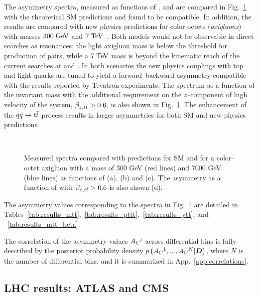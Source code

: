 The asymmetry spectra, measured as functions of
\mtt{}, \pttt{} and \ytt{} are compared in Fig.~\ref{fig:unfac_diff}
with the theoretical SM predictions and found to be compatible. 
In addition, the results are compared with new physics predictions for
color octets ({\it axigluons}) with masses $300 \; \mathrm{GeV}{}$ and $7
\; \mathrm{TeV}{}$~\cite{AguilarSaavedra:2011ci}. Both models would not
be observable in direct searches as \ttbar{} resonances: the light
axigluon mass is below the threshold for production of \ttbar{}
pairs, while a $7 \; \mathrm{TeV}$ mass is beyond the kinematic reach of the
current searches at \seventev{} and \eighttev{}. In both scenarios
the new physics couplings with top and light quarks are tuned to yield a
forward--backward asymmetry compatible with the results reported by
Tevatron experiments. 
The \ac{} spectrum as a function of the \ttbar{} invariant mass \mtt{}
with the additional requirement on the $z$--component of high velocity
of the \ttbar{} system, $\beta_{z,t\bar{t}}{}>0.6$, is also shown in
Fig.~\ref{fig:unfac_diff}. The enhancement of the $q\bar{q}{}\to t\bar{t}{}$
process results in larger asymmetries for both SM and new physics
predictions.
\begin{figure}[!htb]\centering
   \quad
   \\
   \quad
  \caption{Measured \ac{} spectra compared with predictions for SM and
    for a color--octet axigluon with a mass of 300 GeV (red lines) and
    7000 GeV (blue lines) 
    as functions of \mtt{} (a), \pttt{} (b) and \ytt{} (c). The
    asymmetry as a function of \mtt{} with $\beta_{z,t\bar{t}}{}>0.6$ is also
    shown (d).}
  \label{fig:unfac_diff}
\end{figure}
The asymmetry values corresponding to the spectra in
Fig.~\ref{fig:unfac_diff} are detailed in
Tables~\ref{tab:results_mtt},~\ref{tab:results_pttt},~\ref{tab:results_ytt},
and ~\ref{tab:results_mtt_beta}.

The correlation of the asymmetry values $A_C{}^i$ across differential bins is
fully described by the posterior probability density
$p\left(A_C{}^1,...,A_C{}^N|\boldsymbol{D}{}\right)$, where
$N$ is the number of differential bins, and it is summarized in
App.~\ref{app:correlations}.

\subsection{LHC results: ATLAS and CMS}

